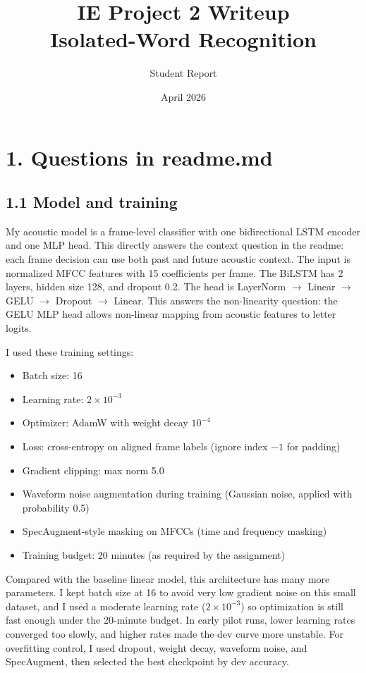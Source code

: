 \documentclass[11pt]{article}
\title{IE Project 2 Writeup\\Isolated-Word Recognition}
\author{Student Report}
\date{April 2026}
\begin{document}
\maketitle

\section*{1. Questions in readme.md}

\subsection*{1.1 Model and training}
My acoustic model is a frame-level classifier with one bidirectional LSTM encoder and one MLP head.
This directly answers the context question in the readme: each frame decision can use both past and future acoustic context.
The input is normalized MFCC features with 15 coefficients per frame. The BiLSTM has 2 layers, hidden size 128, and dropout 0.2.
The head is LayerNorm $\rightarrow$ Linear $\rightarrow$ GELU $\rightarrow$ Dropout $\rightarrow$ Linear.
This answers the non-linearity question: the GELU MLP head allows non-linear mapping from acoustic features to letter logits.

I used these training settings:
\begin{itemize}
    \item Batch size: 16
    \item Learning rate: $2 \times 10^{-3}$
    \item Optimizer: AdamW with weight decay $10^{-4}$
    \item Loss: cross-entropy on aligned frame labels (ignore index $-1$ for padding)
    \item Gradient clipping: max norm 5.0
    \item Waveform noise augmentation during training (Gaussian noise, applied with probability 0.5)
    \item SpecAugment-style masking on MFCCs (time and frequency masking)
    \item Training budget: 20 minutes (as required by the assignment)
\end{itemize}

Compared with the baseline linear model, this architecture has many more parameters.
I kept batch size at 16 to avoid very low gradient noise on this small dataset, and I used a moderate learning rate ($2 \times 10^{-3}$) so optimization is still fast enough under the 20-minute budget.
In early pilot runs, lower learning rates converged too slowly, and higher rates made the dev curve more unstable.
For overfitting control, I used dropout, weight decay, waveform noise, and SpecAugment, then selected the best checkpoint by dev accuracy.
\end{document}
